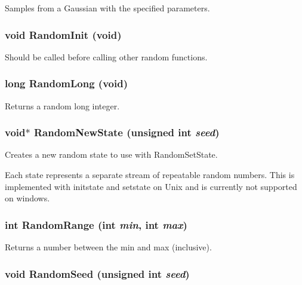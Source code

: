 Samples from a Gaussian with the specified parameters. 

\subsubsection{\setlength{\rightskip}{0pt plus 5cm}void Random\-Init (void)}\label{random_8h_a0}


Should be called before calling other random functions. 

\subsubsection{\setlength{\rightskip}{0pt plus 5cm}long Random\-Long (void)}\label{random_8h_a2}


Returns a random long integer. 

\subsubsection{\setlength{\rightskip}{0pt plus 5cm}void$\ast$ Random\-New\-State (unsigned int {\em seed})}\label{random_8h_a7}


Creates a new random state to use with Random\-Set\-State. 

Each state represents a separate stream of repeatable random numbers. This is implemented with initstate and setstate on Unix and is currently not supported on windows. 
\subsubsection{\setlength{\rightskip}{0pt plus 5cm}int Random\-Range (int {\em min}, int {\em max})}\label{random_8h_a1}


Returns a number between the min and max (inclusive). 

\subsubsection{\setlength{\rightskip}{0pt plus 5cm}void Random\-Seed (unsigned int {\em seed})}\label{random_8h_a6}


